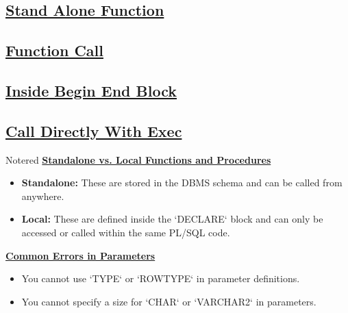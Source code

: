 

\newpage

\subsection*{\underline{Stand Alone Function}}



\subsection*{\underline{Function Call}}

\subsection*{\underline{Inside Begin End Block}}



\subsection*{\underline{Call Directly With Exec}}



\vspace{0.25cm}

\begin{prettyBox}{Note}{red}
\textbf{\underline{Standalone vs. Local Functions and Procedures}}
\begin{itemize}
    \item \textbf{Standalone:} These are stored in the DBMS schema and can be called from anywhere.
    \item \textbf{Local:} These are defined inside the `DECLARE` block and can only be accessed or called within the same PL/SQL code.
\end{itemize}

\vspace{0.25cm}

\textbf{\underline{Common Errors in Parameters}}

\begin{itemize}
    \item You cannot use `TYPE` or `ROWTYPE` in parameter definitions.
    \item You cannot specify a size for `CHAR` or `VARCHAR2` in parameters.
\end{itemize}
\end{prettyBox}




